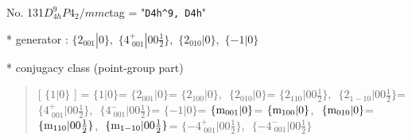 \documentclass[fleqn,10pt,landscape]{jsarticle}
\begin{document}
\newpage

No. 131\quad$D_{4h}^{9}$\quad$P4_2/mmc$\quad[ tetragonal ]
tag = "{\tt D4h^9, D4h}"

* generator : $\{2{}_{001}|0\},\,\,\{4^{+}_{\,\,001}|0 0 \frac{1}{2}\},\,\,\{2{}_{010}|0\},\,\,\{-1|0\}$

* conjugacy class (point-group part)
\begin{quote}
[ $\{1|0\}$ ] = \quad $\{1|0\}$\newline[ $\{2{}_{001}|0\}$ ] = \quad $\{2{}_{001}|0\}$\newline[ $\{2{}_{100}|0\}$ ] = \quad $\{2{}_{100}|0\}$,\,\, $\{2{}_{010}|0\}$\newline[ $\{2{}_{110}|0 0 \frac{1}{2}\}$ ] = \quad $\{2{}_{110}|0 0 \frac{1}{2}\}$,\,\, $\{2{}_{1-10}|0 0 \frac{1}{2}\}$\newline[ $\{4^{+}_{\,\,001}|0 0 \frac{1}{2}\}$ ] = \quad $\{4^{+}_{\,\,001}|0 0 \frac{1}{2}\}$,\,\, $\{4^{-}_{\,\,001}|0 0 \frac{1}{2}\}$\newline[ $\{-1|0\}$ ] = \quad $\{-1|0\}$\newline[ $\{{\rm m}_{001}|0\}$ ] = \quad $\{{\rm m}_{001}|0\}$\newline[ $\{{\rm m}_{100}|0\}$ ] = \quad $\{{\rm m}_{100}|0\}$,\,\, $\{{\rm m}_{010}|0\}$\newline[ $\{{\rm m}_{110}|0 0 \frac{1}{2}\}$ ] = \quad $\{{\rm m}_{110}|0 0 \frac{1}{2}\}$,\,\, $\{{\rm m}_{1-10}|0 0 \frac{1}{2}\}$\newline[ $\{-4^{+}_{\,\,001}|0 0 \frac{1}{2}\}$ ] = \quad $\{-4^{+}_{\,\,001}|0 0 \frac{1}{2}\}$,\,\, $\{-4^{-}_{\,\,001}|0 0 \frac{1}{2}\}$\newline
\end{quote}
\end{document}
